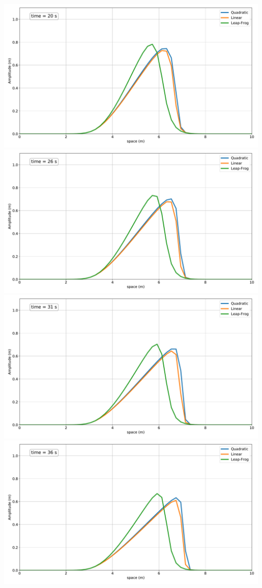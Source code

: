 \includegraphics[width=\linewidth]{../BurgersEquation/images/imp4.pdf}
\includegraphics[width=\linewidth]{../BurgersEquation/images/imp5.pdf}
\includegraphics[width=\linewidth]{../BurgersEquation/images/imp6.pdf}
\includegraphics[width=\linewidth]{../BurgersEquation/images/imp7.pdf}
